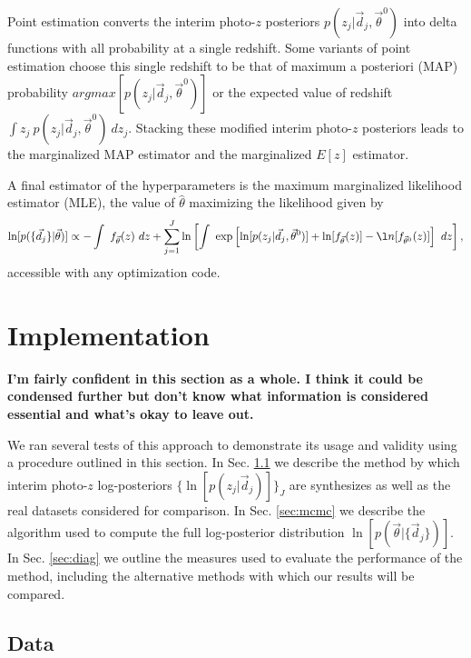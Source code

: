 \documentclass[preprint]{aastex}
\begin{document}
Point estimation converts the interim photo-$z$ posteriors 
$p(z_{j}|\vec{d}_{j},\vec{\theta}^{0})$ into delta functions with all 
probability at a single redshift.  Some variants of point estimation choose 
this single redshift to be that of maximum a posteriori (MAP) probability 
$argmax[p(z_{j}|\vec{d}_{j},\vec{\theta}^{0})]$ or the expected value of 
redshift $\int z_{j}\ p(z_{j}|\vec{d}_{j},\vec{\theta}^{0})\ dz_{j}$.  Stacking 
these modified interim photo-$z$ posteriors leads to the marginalized MAP 
estimator and the marginalized $E[z]$ estimator.

A final estimator of the hyperparameters is the maximum marginalized likelihood 
estimator (MLE), the value of $\hat{\theta}$ maximizing the likelihood given by 
\begin{equation}\label{eq:mmle} \ln[p(\{\vec{d}_{j}\}|\vec{\theta})] \propto 
-\int\ f_{\vec{\theta}}(z)\ dz+\sum_{j=1}^{J}\ln\left[\int\ 
\exp\left[\ln[p(z_{j}|\vec{d}_{j},\vec{\theta}^{0})]+\ln[f_{\vec{\theta}}(z)]-\l
n[f_{\vec{\theta}^{0}}(z)]\right]\ dz\right],\end{equation} accessible with any 
optimization code.

\section{Implementation}
\label{sec:exp}

\textbf{I'm fairly confident in this section as a whole.  I think it could be 
condensed further but don't know what information is considered essential and 
what's okay to leave out.}

We ran several tests of this approach to demonstrate its usage and validity 
using a procedure outlined in this section.  In Sec. \ref{sec:alldata} we 
describe the method by which interim photo-$z$ log-posteriors 
$\{\ln[p(z_{j}|\vec{d}_{j})]\}_{J}$ are synthesizes as well as the real 
datasets considered for comparison.  In Sec. \ref{sec:mcmc} we describe the 
algorithm used to compute the full log-posterior distribution 
$\ln[p(\vec{\theta}|\{\vec{d}_{j}\})]$.  In Sec. \ref{sec:diag} we outline the 
measures used to evaluate the performance of the method, including the 
alternative methods with which our results will be compared.

\subsection{Data}
\label{sec:alldata}
\end{document}
